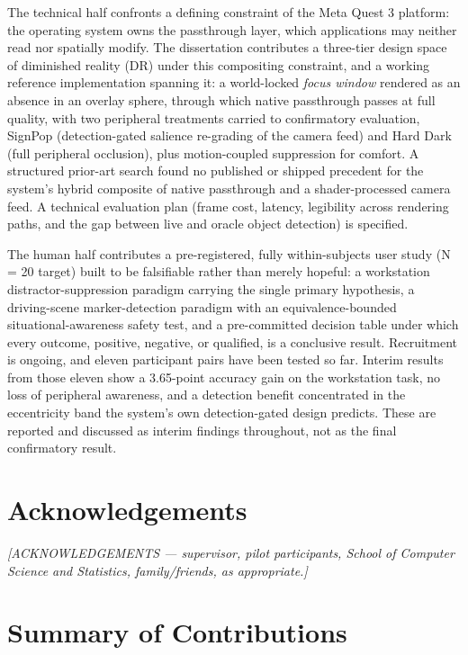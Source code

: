 The technical half confronts a defining constraint of the Meta Quest 3 platform: the operating system
owns the passthrough layer, which applications may neither read nor spatially modify. The
dissertation contributes a three-tier design space of diminished reality (DR) under this compositing
constraint, and a working reference implementation spanning it: a world-locked \textit{focus window} rendered as an absence in an overlay sphere, through which native passthrough passes at full quality, with two peripheral treatments  carried to confirmatory evaluation, SignPop (detection-gated salience re-grading of the camera feed) and Hard Dark (full peripheral occlusion), plus motion-coupled suppression for
comfort. A structured prior-art search found no published or shipped precedent for the system's
hybrid composite of native passthrough and a shader-processed camera feed. A technical evaluation
plan (frame cost, latency, legibility across rendering paths, and the gap between live and oracle
object detection) is specified.

The human half contributes a pre-registered, fully within-subjects user study (N = 20 target) built
to be falsifiable rather than merely hopeful: a workstation distractor-suppression paradigm carrying
the single primary hypothesis, a driving-scene marker-detection paradigm with an equivalence-bounded
situational-awareness safety test, and a pre-committed decision table under which every outcome,
positive, negative, or qualified, is a conclusive result. Recruitment is ongoing, and eleven
participant pairs have been tested so far. Interim results from those eleven show a 3.65-point
accuracy gain on the workstation task, no loss of peripheral awareness, and a detection benefit
concentrated in the eccentricity band the system's own detection-gated design predicts. These are
reported and discussed as interim findings throughout, not as the final confirmatory result.

\newpage

\section*{\Huge\textcolor{tcd_blue}{Acknowledgements}}

\textit{[ACKNOWLEDGEMENTS — supervisor, pilot participants, School of Computer Science and Statistics,
family/friends, as appropriate.]}

\newpage

\section*{\Huge\textcolor{tcd_blue}{Summary of Contributions}}

